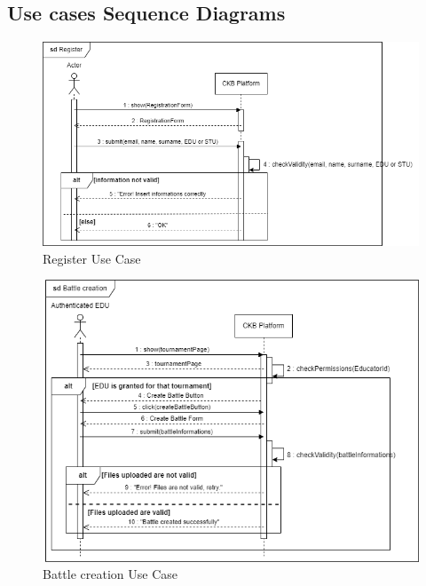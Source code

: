 \subsection{Use cases Sequence Diagrams}
\begin{figure}[H]
    \centering
    \includegraphics[width=1\textwidth]{images/sequence_diagrams/ClassDiagram-UC1 -SequenceDiagram.png}
    \caption{Register Use Case}
    \label{fig:uc1}
\end{figure}
\begin{figure}[H]
    \centering
    \includegraphics[width=1\textwidth]{images/sequence_diagrams/ClassDiagram-UC4- SequenceDiagram.png}
    \caption{Battle creation Use Case}
    \label{fig:uc4}
\end{figure}

